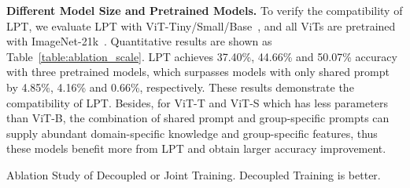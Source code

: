 \documentclass{article} \usepackage{iclr2023_conference,times}
\begin{document}
\textbf{Different Model Size and Pretrained Models. }
To verify the compatibility of LPT, we evaluate LPT with ViT-Tiny/Small/Base~\citep{dosovitskiy2021an}, and all ViTs are pretrained with ImageNet-21k~\citep{deng2009imagenet}. Quantitative results are shown as Table~\ref{table:ablation_scale}. LPT achieves 37.40\%, 44.66\% and 50.07\% accuracy with three pretrained models, which surpasses models with only shared prompt by 4.85\%, 4.16\% and 0.66\%, respectively. 
These results demonstrate the compatibility of LPT. Besides, for ViT-T and ViT-S which has less parameters than ViT-B, the combination of shared prompt and group-specific prompts can supply abundant domain-specific knowledge and group-specific features, thus these models benefit more from LPT and obtain larger accuracy improvement. 
\begin{table}[h]
\centering
\begin{minipage}[t]{0.48\textwidth}
   \renewcommand\arraystretch{1.3}
\centering
   \caption{Ablation Study of Decoupled or Joint Training. Decoupled Training is better. }
   \vspace{-0.5em}
   \setlength{\tabcolsep}{12.6pt} \renewcommand{\arraystretch}{2.2}{ \fontsize{8.3}{3}}
   \label{table:ablation_decoupled}
\end{minipage}\hspace{4mm}
\begin{minipage}[t]{0.48\textwidth}
   \renewcommand\arraystretch{1.3}
\centering
   \caption{Ablation study of query function in phase 2. Using phase 1 as query is better. }
   \vspace{-0.5em}
   \setlength{\tabcolsep}{10.6pt} \renewcommand{\arraystretch}{2.2}{ \fontsize{8.3}{3}}
   \label{table:ablation_query}
\end{minipage}
\vspace{-1em}
\end{table}
\end{document}
